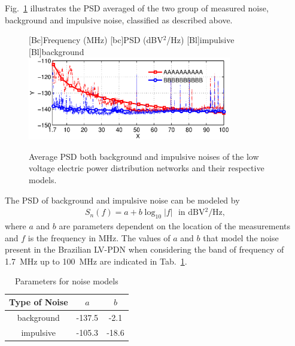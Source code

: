 \documentclass[journal]{IEEEtran}
\newcommand{\tamfig}{3.5in}    %
\begin{document}
Fig.~\ref{Fig:PSDRuidoFundoImp} illustrates the PSD averaged of the two group of measured noise, background and impulsive noise, classified as described above. 
\begin{figure}[!htp]
\begin{centering}
    [Bc]{Frequency (MHz)}    
    [bc]{PSD (dBV$^2$/Hz)}
    [Bl]{impulsive}
    [Bl]{background}
    \includegraphics[width=\tamfig]{Figuras/PSDRuidoFundoImp.eps}
    \caption{Average PSD both background and impulsive noises of the low voltage electric power distribution networks and their respective models.}
    \label{Fig:PSDRuidoFundoImp}
\end{centering}
\end{figure}

The PSD of background and impulsive noise can be modeled by
\begin{eqnarray}\label{eq-psdOutdoor}
S_n(f) = a + b\log_{10}|f| \ \ \ \mbox{in dBV$^2$/Hz},  
\end{eqnarray}
where $a$ and $b$ are parameters dependent on the location of the measurements and $f$ is the frequency in MHz. The values of $a$ and $b$ that model the noise present in the Brazilian \ac{LV-PDN} when considering the band of frequency of 1.7~MHz up to 100~MHz are indicated in Tab.~\ref{Tab:ParamNoise}. 
\begin{table}[!htb]
\centering
\caption{Parameters for noise models}
\footnotesize 
\begin{tabular}{c|c|c}
\hline 
Type of Noise    & $a$ & $b$\\ 
\hline 
background & -137.5 & -2.1  \\
\hline
impulsive & -105.3 & -18.6  \\
\hline
\end{tabular} \label{Tab:ParamNoise}
\end{table}
\end{document}
